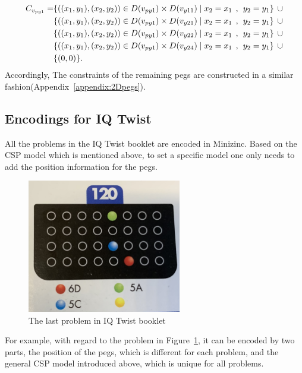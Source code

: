 \begin{equation}
\label{equ:fourthconstrain}
\begin{aligned}  
\Constraint{py1} = &\{((x_{1},y_{1}),(x_{2},y_{2}))\in \Domain{py1} \times \Domain{y11}\mid x_{2} = x_{1} \hspace{1ex} , \hspace{1ex}  y_{2} = y_{1}\}\hspace{1ex} \cup  
\\&\{((x_{1},y_{1}),(x_{2},y_{2}))\in \Domain{py1} \times \Domain{y21}\mid x_{2} = x_{1} \hspace{1ex} , \hspace{1ex}  y_{2} = y_{1}\}\hspace{1ex} \cup 
\\&\{ ((x_{1},y_{1}),(x_{2},y_{2}))\in \Domain{py1} \times \Domain{y22}\mid x_{2} = x_{1} \hspace{1ex} , \hspace{1ex}  y_{2} = y_{1}\}\hspace{1ex}\cup 
\\& \{((x_{1},y_{1}),(x_{2},y_{2}))\in \Domain{py1} \times \Domain{y24}\mid x_{2} = x_{1} \hspace{1ex} , \hspace{1ex}  y_{2} = y_{1}\} \hspace{1ex}\cup
\\& \{(0,0)\}.
\end{aligned}
\end{equation}
Accordingly, The constraints of the remaining pegs are constructed in a similar fashion(Appendix~\ref{appendix:2Dpegs}).
\subsection{Encodings for IQ Twist}
\label{section:Encodings1}
All the problems in the IQ Twist booklet are encoded in Minizinc. Based on the CSP model which is mentioned above, to set a specific model one only needs to add the position information for the pegs. 
\begin{figure}[htbp]
    \centering
    \includegraphics[width=0.6\textwidth]{figs/implementation1.jpg}
    \caption{The last problem in IQ Twist booklet}
    \label{fig:last_case}
\end{figure}
For example, with regard to the problem in Figure~\ref{fig:last_case}, it can be encoded by two parts, the position of the pegs, which is different for each problem, and the general CSP model introduced above, which is unique for all problems.

